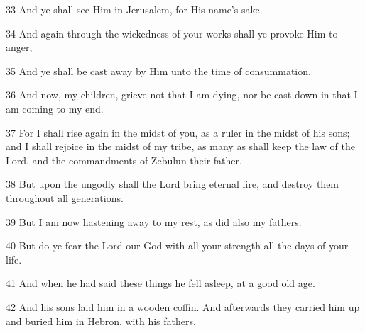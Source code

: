 \par 33 And ye shall see Him in Jerusalem, for His name's sake.

\par 34 And again through the wickedness of your works shall ye provoke Him to anger,

\par 35 And ye shall be cast away by Him unto the time of consummation.

\par 36 And now, my children, grieve not that I am dying, nor be cast down in that I am coming to my end.

\par 37 For I shall rise again in the midst of you, as a ruler in the midst of his sons; and I shall rejoice in the midst of my tribe, as many as shall keep the law of the Lord, and the commandments of Zebulun their father.

\par 38 But upon the ungodly shall the Lord bring eternal fire, and destroy them throughout all generations.

\par 39 But I am now hastening away to my rest, as did also my fathers.

\par 40 But do ye fear the Lord our God with all your strength all the days of your life.

\par 41 And when he had said these things he fell asleep, at a good old age.

\par 42 And his sons laid him in a wooden coffin. And afterwards they carried him up and buried him in Hebron, with his fathers.



